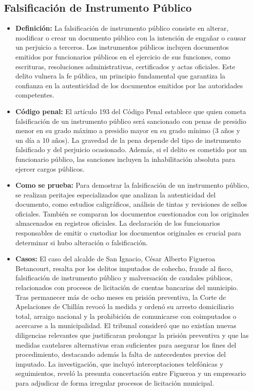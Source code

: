 \documentclass[letter,12pt]{article}
\begin{document}
	\subsection{Falsificación de Instrumento Público}
	\begin{itemize}
		\item \textbf{Definición: }La falsificación de instrumento público consiste en alterar, modificar o crear un documento público con la intención de engañar o causar un perjuicio a terceros. Los instrumentos públicos incluyen documentos emitidos por funcionarios públicos en el ejercicio de sus funciones, como escrituras, resoluciones administrativas, certificados y actas oficiales. Este delito vulnera la fe pública, un principio fundamental que garantiza la confianza en la autenticidad de los documentos emitidos por las autoridades competentes.\\
		
		\item \textbf{Código penal: }El artículo 193 del Código Penal establece que quien cometa falsificación de un instrumento público será sancionado con penas de presidio menor en su grado máximo a presidio mayor en su grado mínimo (3 años y un día a 10 años). La gravedad de la pena depende del tipo de instrumento falsificado y del perjuicio ocasionado. Además, si el delito es cometido por un funcionario público, las sanciones incluyen la inhabilitación absoluta para ejercer cargos públicos.\\
		
		\item \textbf{Como se prueba: }Para demostrar la falsificación de un instrumento público, se realizan peritajes especializados que analizan la autenticidad del documento, como estudios caligráficos, análisis de tintas y revisiones de sellos oficiales. También se comparan los documentos cuestionados con los originales almacenados en registros oficiales. La declaración de los funcionarios responsables de emitir o custodiar los documentos originales es crucial para determinar si hubo alteración o falsificación.\\
		
		\item \textbf{Casos: }El caso del alcalde de San Ignacio, César Alberto Figueroa Betancourt, resalta por los delitos imputados de cohecho, fraude al fisco, falsificación de instrumento público y malversación de caudales públicos, relacionados con procesos de licitación de cuentas bancarias del municipio. Tras permanecer más de ocho meses en prisión preventiva, la Corte de Apelaciones de Chillán revocó la medida y ordenó su arresto domiciliario total, arraigo nacional y la prohibición de comunicarse con coimputados o acercarse a la municipalidad. El tribunal consideró que no existían nuevas diligencias relevantes que justificaran prolongar la prisión preventiva y que las medidas cautelares alternativas eran suficientes para asegurar los fines del procedimiento, destacando además la falta de antecedentes previos del imputado. La investigación, que incluyó interceptaciones telefónicas y seguimientos, reveló la presunta concertación entre Figueroa y un empresario para adjudicar de forma irregular procesos de licitación municipal.\\
		

\end{itemize}
\end{document}

